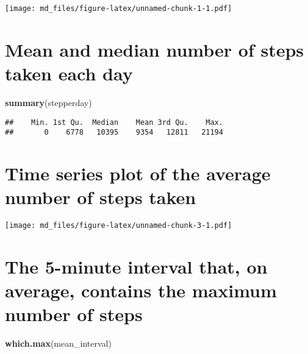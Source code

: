 \documentclass[]{article}
\newenvironment{Shaded}{\begin{snugshade}}{\end{snugshade}}
\newcommand{\KeywordTok}[1]{\textcolor[rgb]{0.13,0.29,0.53}{\textbf{#1}}}
\newcommand{\DataTypeTok}[1]{\textcolor[rgb]{0.13,0.29,0.53}{#1}}
\newcommand{\StringTok}[1]{\textcolor[rgb]{0.31,0.60,0.02}{#1}}
\newcommand{\OperatorTok}[1]{\textcolor[rgb]{0.81,0.36,0.00}{\textbf{#1}}}
\newcommand{\NormalTok}[1]{#1}
\begin{document}
\texttt{[image: md\_files/figure-latex/unnamed-chunk-1-1.pdf]}

\section{Mean and median number of steps taken each
day}\label{mean-and-median-number-of-steps-taken-each-day}

\begin{Shaded}
\begin{Highlighting}[]
\KeywordTok{summary}\NormalTok{(stepperday)}
\end{Highlighting}
\end{Shaded}

\begin{verbatim}
##    Min. 1st Qu.  Median    Mean 3rd Qu.    Max. 
##       0    6778   10395    9354   12811   21194
\end{verbatim}

\section{Time series plot of the average number of steps
taken}\label{time-series-plot-of-the-average-number-of-steps-taken}

\begin{Shaded}
\end{Shaded}

\texttt{[image: md\_files/figure-latex/unnamed-chunk-3-1.pdf]}

\section{The 5-minute interval that, on average, contains the maximum
number of
steps}\label{the-5-minute-interval-that-on-average-contains-the-maximum-number-of-steps}

\begin{Shaded}
\begin{Highlighting}[]
\KeywordTok{which.max}\NormalTok{(mean_interval)}
\end{Highlighting}
\end{Shaded}
\end{document}
